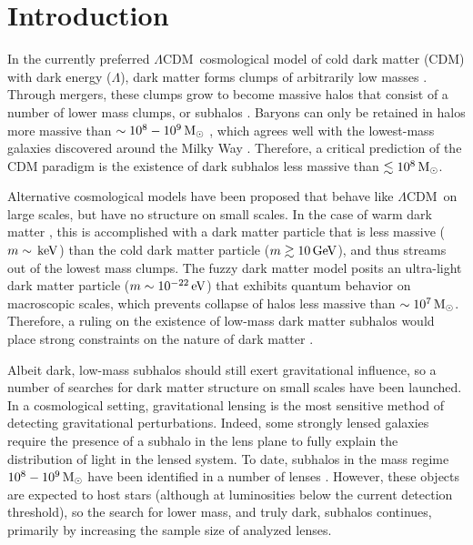 \documentclass[twocolumn]{aastex62}
\newcommand{\acronym}[1]{{\small{#1}}}
\newcommand{\lcdm}{\acronym{$\Lambda$CDM}}
\begin{document}

\section{Introduction}
\label{sec:intro}
In the currently preferred \lcdm\ cosmological model of cold dark matter (CDM) with dark energy ($\Lambda$), dark matter forms clumps of arbitrarily low masses \citep[e.g.,][]{springel2008}.
Through mergers, these clumps grow to become massive halos that consist of a number of lower mass clumps, or subhalos \citep[e.g.,][]{whiterees1978}.
Baryons can only be retained in halos more massive than $\sim10^8-10^9\,\rm M_\odot$ \citep[e.g.,][]{efstathiou1992, bullock2000}, which agrees well with the lowest-mass galaxies discovered around the Milky Way \citep[e.g.,][]{sg2007, martin2008}.
Therefore, a critical prediction of the CDM paradigm is the existence of dark subhalos less massive than $\lesssim10^8\,\rm M_\odot$.

Alternative cosmological models have been proposed that behave like \lcdm\ on large scales, but have no structure on small scales.
In the case of warm dark matter \citep[e.g.,][]{bode2001}, this is accomplished with a dark matter particle that is less massive ($m\sim\rm\, keV$) than the cold dark matter particle ($m\gtrsim10\rm\, GeV$), and thus streams out of the lowest mass clumps.
The fuzzy dark matter model \citep[e.g.,][]{hu2000} posits an ultra-light dark matter particle ($m\sim10^{-22}\rm\, eV$) that exhibits quantum behavior on macroscopic scales, which prevents collapse of halos less massive than $\sim10^7\,\rm M_\odot$.
Therefore, a ruling on the existence of low-mass dark matter subhalos would place strong constraints on the nature of dark matter \citep[e.g.,][]{bullockmbk2017, buckleypeter2017}.

Albeit dark, low-mass subhalos should still exert gravitational influence, so a number of searches for dark matter structure on small scales have been launched.
In a cosmological setting, gravitational lensing is the most sensitive method of detecting gravitational perturbations.
Indeed, some strongly lensed galaxies require the presence of a subhalo in the lens plane to fully explain the distribution of light in the lensed system.
To date, subhalos in the mass regime $10^8-10^9\,\rm M_\odot$ have been identified in a number of lenses \citep[e.g.,][]{vegetti2012,hezaveh2016}.
However, these objects are expected to host stars (although at luminosities below the current detection threshold), so the search for lower mass, and truly dark, subhalos continues, primarily by increasing the sample size of analyzed lenses.
\end{document}
